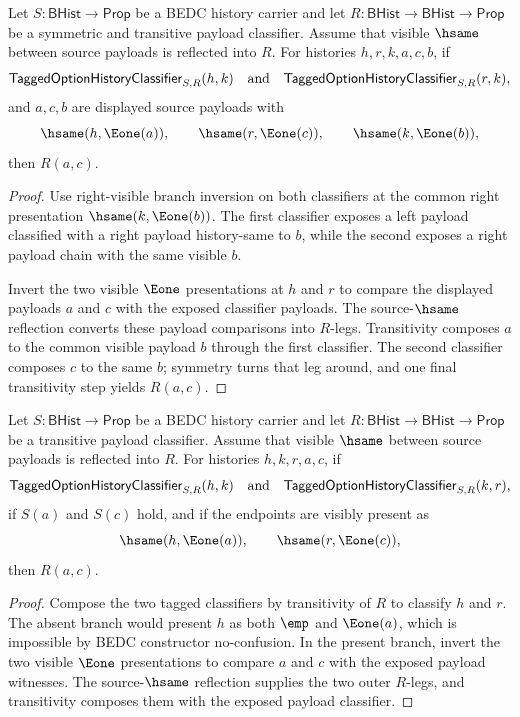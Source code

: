 \begin{theorem}
\label{thm:tagged-option-history-classifier-common-right-visible-payload-classification}
Let $S:\mathsf{BHist}\to\mathsf{Prop}$ be a BEDC history carrier and let
$R:\mathsf{BHist}\to\mathsf{BHist}\to\mathsf{Prop}$ be a symmetric and
transitive payload classifier. Assume that visible $\hsame$ between source
payloads is reflected into $R$. For histories $h,r,k,a,c,b$, if
$$
\mathsf{TaggedOptionHistoryClassifier}_{S,R}(h,k)
\quad\hbox{and}\quad
\mathsf{TaggedOptionHistoryClassifier}_{S,R}(r,k),
$$
and $a,c,b$ are displayed source payloads with
$$
\hsame(h,\Eone(a)),\qquad
\hsame(r,\Eone(c)),\qquad
\hsame(k,\Eone(b)),
$$
then $R(a,c)$.
\end{theorem}
\begin{proof}
Use right-visible branch inversion on both classifiers at the common right
presentation $\hsame(k,\Eone(b))$. The first classifier exposes a left payload
classified with a right payload history-same to $b$, while the second exposes a
right payload chain with the same visible $b$.

Invert the two visible $\Eone$ presentations at $h$ and $r$ to compare the
displayed payloads $a$ and $c$ with the exposed classifier payloads. The
source-$\hsame$ reflection converts these payload comparisons into $R$-legs.
Transitivity composes $a$ to the common visible payload $b$ through the first
classifier. The second classifier composes $c$ to the same $b$; symmetry turns
that leg around, and one final transitivity step yields $R(a,c)$.
\end{proof}

\begin{theorem}
\label{thm:tagged-option-present-chain-visible-endpoint-classification}
Let $S:\mathsf{BHist}\to\mathsf{Prop}$ be a BEDC history carrier and let
$R:\mathsf{BHist}\to\mathsf{BHist}\to\mathsf{Prop}$ be a transitive payload
classifier. Assume that visible $\hsame$ between source payloads is reflected
into $R$. For histories $h,k,r,a,c$, if
$$
\mathsf{TaggedOptionHistoryClassifier}_{S,R}(h,k)
\quad\hbox{and}\quad
\mathsf{TaggedOptionHistoryClassifier}_{S,R}(k,r),
$$
if $S(a)$ and $S(c)$ hold, and if the endpoints are visibly present as
$$
\hsame(h,\Eone(a)),\qquad \hsame(r,\Eone(c)),
$$
then $R(a,c)$.
\end{theorem}
\begin{proof}
Compose the two tagged classifiers by transitivity of $R$ to classify $h$ and
$r$. The absent branch would present $h$ as both $\emp$ and $\Eone(a)$, which is
impossible by BEDC constructor no-confusion. In the present branch, invert the
two visible $\Eone$ presentations to compare $a$ and $c$ with the exposed
payload witnesses. The source-$\hsame$ reflection supplies the two outer
$R$-legs, and transitivity composes them with the exposed payload classifier.
\end{proof}

